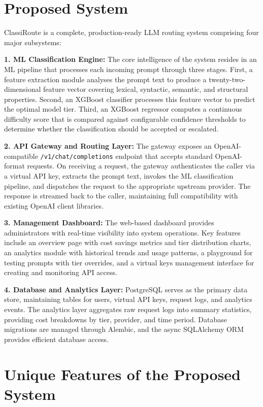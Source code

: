 \documentclass[oneside,12pt,a4paper]{report}
\begin{document}
\section{Proposed System}

ClassiRoute is a complete, production-ready LLM routing system comprising four major subsystems:

\textbf{1. ML Classification Engine:} The core intelligence of the system resides in an ML pipeline that processes each incoming prompt through three stages. First, a feature extraction module analyses the prompt text to produce a twenty-two-dimensional feature vector covering lexical, syntactic, semantic, and structural properties. Second, an XGBoost classifier processes this feature vector to predict the optimal model tier. Third, an XGBoost regressor computes a continuous difficulty score that is compared against configurable confidence thresholds to determine whether the classification should be accepted or escalated.

\textbf{2. API Gateway and Routing Layer:} The gateway exposes an OpenAI-compatible \texttt{/v1/chat/completions} endpoint that accepts standard OpenAI-format requests. On receiving a request, the gateway authenticates the caller via a virtual API key, extracts the prompt text, invokes the ML classification pipeline, and dispatches the request to the appropriate upstream provider. The response is streamed back to the caller, maintaining full compatibility with existing OpenAI client libraries.

\textbf{3. Management Dashboard:} The web-based dashboard provides administrators with real-time visibility into system operations. Key features include an overview page with cost savings metrics and tier distribution charts, an analytics module with historical trends and usage patterns, a playground for testing prompts with tier overrides, and a virtual keys management interface for creating and monitoring API access.

\textbf{4. Database and Analytics Layer:} PostgreSQL serves as the primary data store, maintaining tables for users, virtual API keys, request logs, and analytics events. The analytics layer aggregates raw request logs into summary statistics, providing cost breakdowns by tier, provider, and time period. Database migrations are managed through Alembic, and the async SQLAlchemy ORM provides efficient database access.

\section{Unique Features of the Proposed System}
\end{document}
